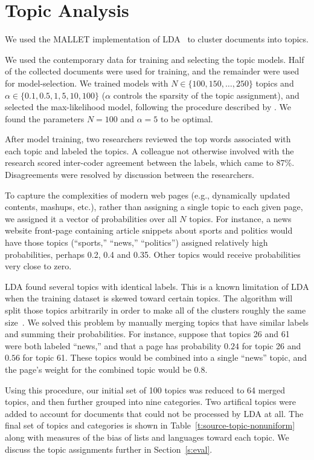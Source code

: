 \section{Topic Analysis}\label{s:analysis}

We used the MALLET implementation of
LDA~\cite{mccallum2002mallet,lda_distributed_2009,lda_sparse_2009} to
cluster documents into topics.

We used the contemporary data for training and selecting the topic
models.  Half of the collected documents were used for training, and
the remainder were used for model-selection.  We trained models with
$N\in \{100, 150, \ldots, 250\}$ topics and $\alpha\in \{0.1, 0.5, 1,
5, 10, 100\}$ ($\alpha$ controls the sparsity of the topic
assignment), and selected the max-likelihood model, following the
procedure described by \textcite{WallachMSM09}.  We
found the parameters $N=100$ and $\alpha=5$ to be optimal.

After model training, two researchers reviewed the top words
associated with each topic and labeled the topics.  A colleague not
otherwise involved with the research scored inter-coder agreement
between the labels, which came to 87\%.  Disagreements were resolved
by discussion between the researchers.

To capture the complexities of modern web pages (e.g., dynamically
updated contents, mashups, etc.), rather than assigning a single
topic to each given page, we assigned it a vector of probabilities
over all $N$ topics.  For instance, a news website front-page
containing article snippets about sports and politics would have
those topics (“sports,” “news,” “politics”) assigned relatively
high probabilities, perhaps 0.2, 0.4 and 0.35.  Other topics would
receive probabilities very close to zero.

LDA found several topics with identical labels.  This is a known
limitation of LDA when the training dataset is skewed toward certain
topics.  The algorithm will split those topics arbitrarily in order to
make all of the clusters roughly the same size~\cite{Xie15Diversify}.
We solved this problem by manually merging topics that have similar
labels and summing their probabilities.  For instance, suppose that
topics 26 and 61 were both labeled “news,” and that a page has
probability $0.24$ for topic 26 and $0.56$ for topic 61.  These topics
would be combined into a single “news” topic, and the page's weight
for the combined topic would be $0.8$.

Using this procedure, our initial set of 100 topics was reduced to 64
merged topics, and then further grouped into nine categories.  Two
artifical topics were added to account for documents that could not be
processed by LDA at all.  The final set of topics and categories is
shown in Table~\ref{t:source-topic-nonuniform} along with measures of
the bias of lists and languages toward each topic.  We discuss the
topic assignments further in Section~\ref{s:eval}.
